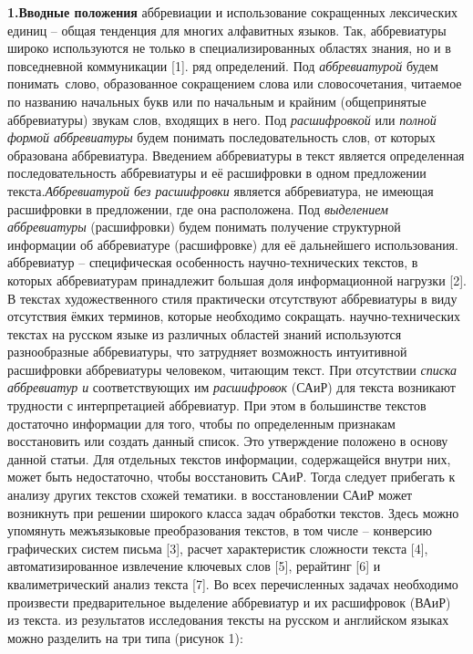 \documentclass[a4paper]{article}
\begin{document}
\textbf{1.Вводные положения}
 аббревиации и использование сокращенных лексических единиц – общая тенденция для многих алфавитных языков. Так, аббревиатуры широко используются не только в специализированных областях знания, но и в повседневной коммуникации [1]. 
 ряд определений. Под \emph{аббревиатурой} будем понимать слово, образованное сокращением слова или словосочетания, читаемое по названию начальных букв или по начальным и крайним (общепринятые аббревиатуры) звукам слов, входящих в него. Под \emph{расшифровкой} или \emph{полной формой аббревиатуры} будем понимать последовательность слов, от которых образована аббревиатура. Введением аббревиатуры в текст является определенная последовательность аббревиатуры и её расшифровки в одном предложении текста.\emph{Аббревиатурой без расшифровки} является аббревиатура, не имеющая расшифровки в предложении, где она расположена. Под \emph{выделением аббревиатуры} (расшифровки) будем понимать получение структурной информации об аббревиатуре (расшифровке) для её дальнейшего использования.
 аббревиатур – специфическая особенность научно-технических текстов, в которых аббревиатурам принадлежит большая доля информационной нагрузки [2]. В текстах художественного стиля практически отсутствуют аббревиатуры в виду отсутствия ёмких терминов, которые необходимо сокращать.
 научно-технических текстах на русском языке из различных областей знаний используются разнообразные аббревиатуры, что затрудняет возможность интуитивной расшифровки аббревиатуры человеком, читающим текст. При отсутствии \emph{списка аббревиатур и} соответствующих им \emph{расшифровок} (САиР) для текста возникают трудности с интерпретацией аббревиатур. При этом в большинстве текстов достаточно информации для того, чтобы по определенным признакам восстановить или создать данный список. Это утверждение положено в основу данной статьи. Для отдельных текстов информации, содержащейся внутри них, может быть недостаточно, чтобы восстановить САиР. Тогда следует прибегать к анализу других текстов схожей тематики.
 в восстановлении САиР может возникнуть при решении широкого класса задач обработки текстов. Здесь можно упомянуть межъязыковые преобразования текстов, в том числе – конверсию графических систем письма [3], расчет характеристик сложности текста [4], автоматизированное извлечение ключевых слов [5], рерайтинг [6] и квалиметрический анализ текста [7]. Во всех перечисленных задачах необходимо произвести предварительное выделение аббревиатур и их расшифровок (ВАиР) из текста.
 из результатов исследования тексты на русском и английском языках можно разделить на три типа (рисунок 1):
\end{document}
